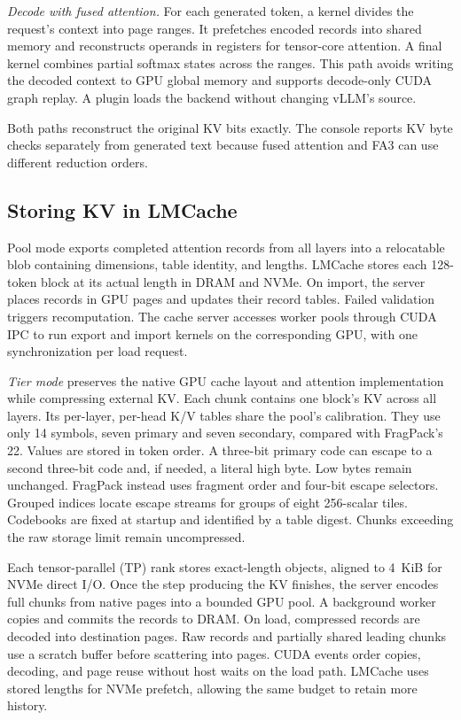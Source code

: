 \documentclass[conference]{IEEEtran}
\begin{document}
\emph{Decode with fused attention.} For each generated token, a kernel divides
the request's context into page ranges. It prefetches encoded records into
shared memory and reconstructs operands in registers for tensor-core
attention. A final kernel combines partial softmax states across the
ranges. This path avoids writing the decoded context to GPU global memory
and supports decode-only CUDA graph replay. A plugin loads the backend
without changing vLLM's source.

Both paths reconstruct the original KV bits exactly. The console reports
KV byte checks separately from generated text because fused attention and
FA3 can use different reduction orders.

\subsection{Storing KV in LMCache}
Pool mode exports completed attention records from all layers into a
relocatable blob containing dimensions, table identity, and lengths.
LMCache stores each 128-token block at its actual length in DRAM and NVMe.
On import, the server places records in GPU pages and updates their record
tables. Failed validation triggers recomputation. The cache server accesses worker
pools through CUDA IPC to run export and import kernels on the corresponding
GPU, with one synchronization per load request.

\emph{Tier mode} preserves the native GPU cache layout and attention
implementation while compressing external KV. Each chunk contains one
block's KV across all layers. Its per-layer, per-head K/V tables share the
pool's calibration. They use only 14 symbols, seven primary and seven
secondary, compared with FragPack's 22. Values are stored in token order. A
three-bit primary code can escape to a second three-bit code and, if
needed, a literal high byte.
Low bytes remain unchanged. FragPack instead uses fragment order and
four-bit escape selectors.
Grouped indices locate escape streams for groups of eight 256-scalar
tiles. Codebooks are fixed at startup and identified by a table digest.
Chunks exceeding the raw
storage limit remain uncompressed.

Each tensor-parallel (TP) rank stores exact-length objects, aligned to
4~KiB for NVMe direct I/O. Once the step producing the KV finishes, the server
encodes full chunks from native pages into a bounded GPU pool.
A background worker copies and commits the records to DRAM. On load,
compressed records are decoded into destination pages. Raw records and
partially shared leading chunks use a scratch buffer before scattering
into pages. CUDA events order copies,
decoding, and page reuse without host waits on the load path. LMCache uses
stored lengths for NVMe prefetch, allowing the same budget to retain more
history.
\end{document}
